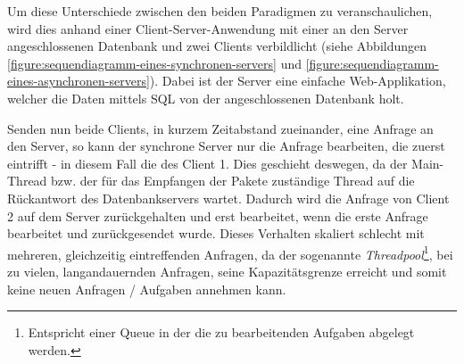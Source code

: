\begin{table}[h]
    \caption{Vergleich zwischen synchroner und asynchroner Ausführung}
    \label{tab:vergleich-synchroner-asynchroner-Ausfuehrung}
\end{table}

Um diese Unterschiede zwischen den beiden Paradigmen zu veranschaulichen, wird dies anhand einer Client-Server-Anwendung mit einer an den Server angeschlossenen Datenbank und zwei Clients verbildlicht (siehe Abbildungen \ref{figure:sequendiagramm-eines-synchronen-servers} und \ref{figure:sequendiagramm-eines-asynchronen-servers}). Dabei ist der Server eine einfache Web-Applikation, welcher die Daten mittels SQL von der angeschlossenen Datenbank holt.

Senden nun beide Clients, in kurzem Zeitabstand zueinander, eine Anfrage an den Server, so kann der synchrone Server nur die Anfrage bearbeiten, die zuerst eintrifft - in diesem Fall die des Client 1. Dies geschieht deswegen, da der Main-Thread bzw. der für das Empfangen der Pakete zuständige Thread auf die Rückantwort des Datenbankservers wartet. Dadurch wird die Anfrage von Client 2 auf dem Server zurückgehalten und erst bearbeitet, wenn die erste Anfrage bearbeitet und zurückgesendet wurde. Dieses Verhalten skaliert schlecht mit mehreren, gleichzeitig eintreffenden Anfragen, da der sogenannte \textit{Threadpool}\footnote{Entspricht einer Queue in der die zu bearbeitenden Aufgaben abgelegt werden.}, bei zu vielen, langandauernden Anfragen, seine Kapazitätsgrenze erreicht und somit keine neuen Anfragen / Aufgaben annehmen kann.

